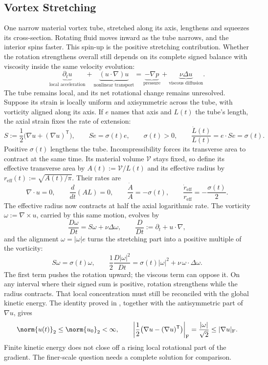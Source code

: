 
\subsection{Vortex Stretching}\label{sub:ThePerfectlyStretchingVortex}

One narrow material vortex tube, stretched along its axis, lengthens and squeezes its cross-section. Rotating fluid moves inward as the tube narrows, and the interior spins faster. This spin-up is the positive stretching contribution. Whether the rotation strengthens overall still depends on its complete signed balance with viscosity inside the same velocity evolution:
\[
  \underbrace{\partial_t u}_{\text{local acceleration}}
  +
  \underbrace{(u\cdot\nabla)u}_{\text{nonlinear transport}}
  =
  \underbrace{-\nabla p}_{\text{pressure}}
  +
  \underbrace{\nu\Delta u}_{\text{viscous diffusion}}.
\]
The tube remains local, and its net rotational change remains unresolved. Suppose its strain is locally uniform and axisymmetric across the tube, with vorticity aligned along its axis. If \(e\) names that axis and \(L(t)\) the tube's length, the axial strain fixes the rate of extension:
\[
  S:=\frac12\bigl(\nabla u+(\nabla u)^{\mathsf T}\bigr),
  \qquad
  Se=\sigma(t)e,
  \qquad
  \sigma(t)>0,
  \qquad
  \frac{\dot L(t)}{L(t)}
  =
  e\cdot Se
  =
  \sigma(t).
\]
Positive \(\sigma(t)\) lengthens the tube. Incompressibility forces its transverse area to contract at the same time. Its material volume \(\mathcal V\) stays fixed, so define its effective transverse area by \(A(t):=\mathcal V/L(t)\) and its effective radius by \(r_{\mathrm{eff}}(t):=\sqrt{A(t)/\pi}\). Their rates are
\[
  \nabla\cdot u=0,
  \qquad
  \frac{d}{dt}(A L)=0,
  \qquad
  \frac{\dot A}{A}=-\sigma(t),
  \qquad
  \frac{\dot r_{\mathrm{eff}}}{r_{\mathrm{eff}}}
  =
  -\frac{\sigma(t)}{2}.
\]
The effective radius now contracts at half the axial logarithmic rate. The vorticity \(\omega:=\nabla\times u\), carried by this same motion, evolves by
\[
  \frac{D\omega}{Dt}
  =
  S\omega+\nu\Delta\omega,
  \qquad
  \frac{D}{Dt}
  :=
  \partial_t+u\cdot\nabla,
\]
and the alignment \(\omega=|\omega|e\) turns the stretching part into a positive multiple of the vorticity:
\[
  S\omega
  =
  \sigma(t)\omega,
  \qquad
  \frac12\frac{D|\omega|^2}{Dt}
  =
  \sigma(t)|\omega|^2
  +
  \nu\,\omega\cdot\Delta\omega.
\]
The first term pushes the rotation upward; the viscous term can oppose it. On any interval where their signed sum is positive, rotation strengthens while the radius contracts. That local concentration must still be reconciled with the global kinetic energy. The identity proved in , together with the antisymmetric part of \(\nabla u\), gives
\[
  \norm{u(t)}_2
  \leq
  \norm{u_0}_2
  <\infty,
  \qquad
  \left|\frac12\bigl(\nabla u-(\nabla u)^{\mathsf T}\bigr)\right|_{\mathrm F}
  =
  \frac{|\omega|}{\sqrt2}
  \leq
  |\nabla u|_{\mathrm F}.
\]
Finite kinetic energy does not close off a rising local rotational part of the gradient. The finer-scale question needs a complete solution for comparison.

